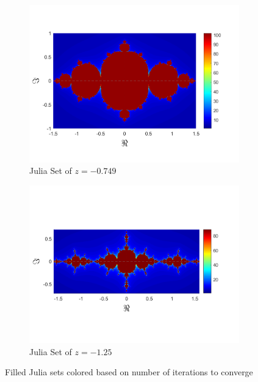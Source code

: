 \documentclass[letterpaper,11pt]{article}
\begin{document}
\begin{figure}
	\begin{subfigure}[b]{0.49\textwidth}
		\includegraphics[width=\textwidth]{../Figures/ColoredJulia3.png}
		\caption{Julia Set of $z = - 0.749$}
		\label{fig:CJ-.749}
	\end{subfigure}
	\begin{subfigure}[b]{0.49\textwidth}
		\includegraphics[width=\textwidth]{../Figures/ColoredJulia4.png}
		\caption{Julia Set of $z = -1.25$}
		\label{fig:CJ-1.25}
	\end{subfigure}
	\caption{Filled Julia sets colored based on number of iterations to converge}
	\label{fig:FJwithC}
\end{figure}
\end{document}
